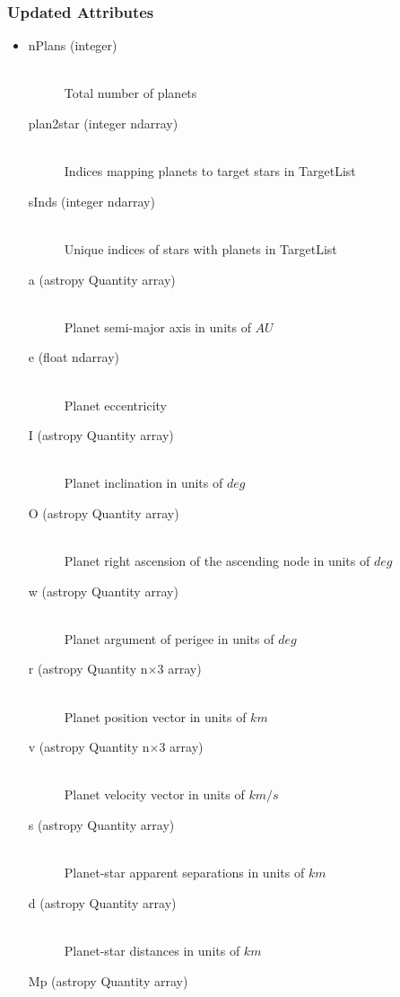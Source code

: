 \documentclass[cleanfoot]{asme2ej}
\begin{document}
\subsubsection*{Updated Attributes}
\begin{itemize}
    \item 
    \begin{description}
        \item[nPlans (integer)] \hfill \\
        Total number of planets
        \item[plan2star (integer ndarray)] \hfill \\
        Indices mapping planets to target stars in TargetList
        \item[sInds (integer ndarray)] \hfill \\
        Unique indices of stars with planets in TargetList
        \item[a (astropy Quantity array)] \hfill \\
        Planet semi-major axis in units of $ AU $
        \item[e (float ndarray)] \hfill \\
        Planet eccentricity
        \item[I (astropy Quantity array)] \hfill \\
        Planet inclination in units of $ deg $ 
        \item[O (astropy Quantity array)] \hfill \\
        Planet right ascension of the ascending node in units of $ deg $
        \item[w (astropy Quantity array)] \hfill \\
        Planet argument of perigee in units of $ deg $
        \item[r (astropy Quantity n$\times$3 array)] \hfill \\ Planet position vector in units of $ km $
        \item[v (astropy Quantity n$\times$3 array)] \hfill \\ Planet velocity vector in units of $ km/s $
        \item[s (astropy Quantity array)] \hfill \\
        Planet-star apparent separations in units of $ km $
        \item[d (astropy Quantity array)] \hfill \\
        Planet-star distances in units of $ km $
        \item[Mp (astropy Quantity array)] \hfill \\

\end{description}
\end{itemize}
\end{document}
